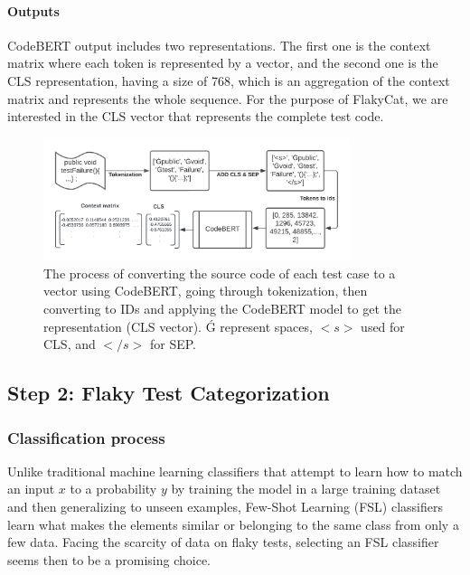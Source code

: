 \paragraph{Outputs}

CodeBERT output includes two representations. The first one is the context matrix where each token is represented by a vector, and the second one is the CLS representation, having a size of 768, which is an aggregation of the context matrix and represents the whole sequence.
For the purpose of FlakyCat, we are interested in the CLS vector that represents the complete test code.

\begin{figure}[htbp]
\centering
\includegraphics[width = 0.8\textwidth, scale=1]{figures/flakycat/codebert_transform.png}
\caption{The process of converting the source code of each test case to a vector using CodeBERT, going through tokenization, then converting to IDs and applying the CodeBERT model to get the representation (CLS vector). Ǵ represent spaces, $<s>$ used for CLS, and $</s>$ for SEP. }
\label{fig:using_codebert}
\end{figure}

\subsection{Step 2: Flaky Test Categorization}

\subsubsection{Classification process}

Unlike traditional machine learning classifiers that attempt to learn how to match an input $x$ to a probability $y$ by training the model in a large training dataset and then generalizing to unseen examples, Few-Shot Learning (FSL) classifiers learn what makes the elements similar or belonging to the same class from only a few data. Facing the scarcity of data on flaky tests, selecting an FSL classifier seems then to be a promising choice. 

